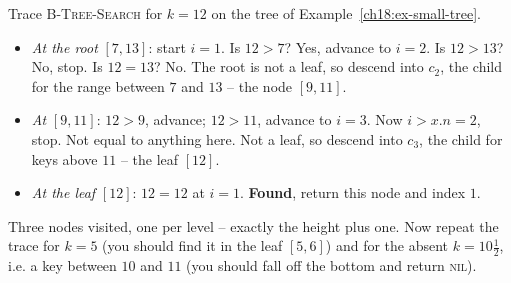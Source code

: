 \begin{labbox}
Trace \textsc{B-Tree-Search} for $k = 12$ on the tree of
Example~\ref{ch18:ex-small-tree}.

\begin{center}
\end{center}
\begin{itemize}
\item \emph{At the root} $[7,13]$: start $i=1$. Is $12 > 7$? Yes, advance to $i=2$.
Is $12 > 13$? No, stop. Is $12 = 13$? No. The root is not a leaf, so descend into
$c_2$, the child for the range between $7$ and $13$ -- the node $[9,11]$.
\item \emph{At} $[9,11]$: $12 > 9$, advance; $12 > 11$, advance to $i=3$. Now
$i > x.n = 2$, stop. Not equal to anything here. Not a leaf, so descend into $c_3$,
the child for keys above $11$ -- the leaf $[12]$.
\item \emph{At the leaf} $[12]$: $12 = 12$ at $i=1$. \textbf{Found}, return this
node and index $1$.
\end{itemize}
Three nodes visited, one per level -- exactly the height plus one. Now repeat the
trace for $k = 5$ (you should find it in the leaf $[5,6]$) and for the absent
$k = 10\tfrac12$, i.e. a key between $10$ and $11$ (you should fall off the bottom
and return \textsc{nil}).
\end{labbox}

